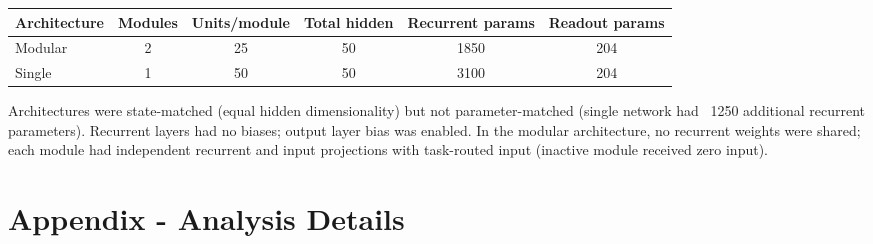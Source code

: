 \documentclass{article}
\theoremstyle{plain}
\theoremstyle{definition}
\theoremstyle{remark}
\begin{document}
\begin{table}[h]
\centering
\small
\begin{tabular}{lccccc}
\toprule
Architecture & Modules & Units/module & Total hidden & Recurrent params & Readout params \\
\midrule
Modular & 2 & 25 & 50 & 1850 & 204 \\
Single & 1 & 50 & 50 & 3100 & 204 \\
\bottomrule
\end{tabular}
\end{table}

Architectures were state-matched (equal hidden dimensionality) but not parameter-matched (single network had ~1250 additional recurrent parameters). Recurrent layers had no biases; output layer bias was enabled. In the modular architecture, no recurrent weights were shared; each module had independent recurrent and input projections with task-routed input (inactive module received zero input).


\section{Appendix - Analysis Details}
\label{sec:appendix:analysis-details}
\end{document}
